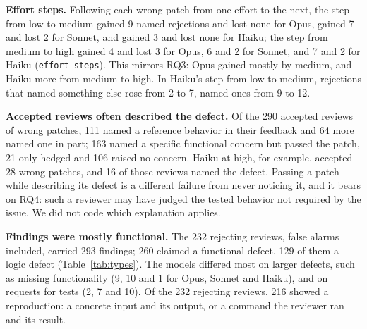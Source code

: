 \documentclass[sigconf,nonacm]{acmart}
\newcommand{\code}[1]{\texttt{#1}}
\begin{document}
\textbf{Effort steps.} Following each wrong patch from one effort to the next, the step from low to medium gained 9 named rejections and lost none for Opus, gained 7 and lost 2 for Sonnet, and gained 3 and lost none for Haiku; the step from medium to high gained 4 and lost 3 for Opus, 6 and 2 for Sonnet, and 7 and 2 for Haiku (\code{effort\_steps}). This mirrors RQ3: Opus gained mostly by medium, and Haiku more from medium to high. In Haiku's step from low to medium, rejections that named something else rose from 2 to 7, named ones from 9 to 12.

\textbf{Accepted reviews often described the defect.} Of the 290 accepted reviews of wrong patches, 111 named a reference behavior in their feedback and 64 more named one in part; 163 named a specific functional concern but passed the patch, 21 only hedged and 106 raised no concern. Haiku at high, for example, accepted 28 wrong patches, and 16 of those reviews named the defect. Passing a patch while describing its defect is a different failure from never noticing it, and it bears on RQ4: such a reviewer may have judged the tested behavior not required by the issue. We did not code which explanation applies.

\textbf{Findings were mostly functional.} The 232 rejecting reviews, false alarms included, carried 293 findings; 260 claimed a functional defect, 129 of them a logic defect (Table~\ref{tab:types}). The models differed most on larger defects, such as missing functionality (9, 10 and 1 for Opus, Sonnet and Haiku), and on requests for tests (2, 7 and 10). Of the 232 rejecting reviews, 216 showed a reproduction: a concrete input and its output, or a command the reviewer ran and its result.
\end{document}
